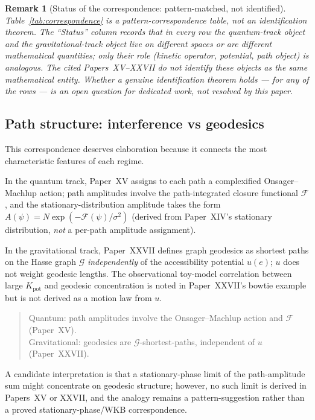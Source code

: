 \documentclass[12pt]{article}
\newtheorem{remark}[theorem]{Remark}
\newcommand{\Gcal}{\mathcal{G}}
\newcommand{\Fcal}{\mathcal{F}}
\begin{document}
\begin{remark}[Status of the correspondence: pattern-matched, not identified]
Table~\ref{tab:correspondence} is a \emph{pattern-correspondence table}, not an identification theorem. The ``Status'' column records that in every row the quantum-track object and the gravitational-track object live on different spaces or are different mathematical quantities; only their \emph{role} (kinetic operator, potential, path object) is analogous. The cited Papers~XV--XXVII do \emph{not} identify these objects as the same mathematical entity. Whether a genuine identification theorem holds --- for any of the rows --- is an open question for dedicated work, not resolved by this paper.
\end{remark}

\subsection{Path structure: interference vs geodesics}

This correspondence deserves elaboration because it connects the most characteristic features of each regime.

In the quantum track, Paper~XV assigns to each path a complexified Onsager--Machlup action; path amplitudes involve the path-integrated closure functional $\Fcal$, and the stationary-distribution amplitude takes the form $A(\psi) = N \exp(-\Fcal(\psi)/\sigma^2)$ (derived from Paper~XIV's stationary distribution, \emph{not} a per-path amplitude assignment).

In the gravitational track, Paper~XXVII defines graph geodesics as shortest paths on the Hasse graph $\Gcal$ \emph{independently} of the accessibility potential $u(e)$; $u$ does not weight geodesic lengths. The observational toy-model correlation between large $K_{\mathrm{pot}}$ and geodesic concentration is noted in Paper~XXVII's bowtie example but is not derived as a motion law from $u$.

\begin{quote}
Quantum: path amplitudes involve the Onsager--Machlup action and $\Fcal$ (Paper~XV).\\
Gravitational: geodesics are $\Gcal$-shortest-paths, independent of $u$ (Paper~XXVII).
\end{quote}

A candidate interpretation is that a stationary-phase limit of the path-amplitude sum might concentrate on geodesic structure; however, no such limit is derived in Papers~XV or XXVII, and the analogy remains a pattern-suggestion rather than a proved stationary-phase/WKB correspondence.
\end{document}

